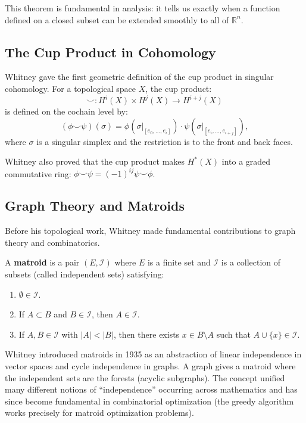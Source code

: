This theorem is fundamental in analysis: it tells us exactly when a function defined on a closed subset can be extended smoothly to all of $\mathbb{R}^n$.

\subsection{The Cup Product in Cohomology}

Whitney gave the first geometric definition of the cup product in singular cohomology. For a topological space $X$, the cup product:
\[
\smile: H^i(X) \times H^j(X) \to H^{i+j}(X)
\]
is defined on the cochain level by:
\[
(\phi \smile \psi)(\sigma) = \phi(\sigma|_{[e_0,\dots,e_i]}) \cdot \psi(\sigma|_{[e_i,\dots,e_{i+j}]}),
\]
where $\sigma$ is a singular simplex and the restriction is to the front and back faces.

Whitney also proved that the cup product makes $H^*(X)$ into a graded commutative ring: $\phi \smile \psi = (-1)^{ij} \psi \smile \phi$.

\subsection{Graph Theory and Matroids}

Before his topological work, Whitney made fundamental contributions to graph theory and combinatorics.

A \textbf{matroid} is a pair $(E, \mathcal{I})$ where $E$ is a finite set and $\mathcal{I}$ is a collection of subsets (called independent sets) satisfying:
\begin{enumerate}
    \item $\emptyset \in \mathcal{I}$.
    \item If $A \subset B$ and $B \in \mathcal{I}$, then $A \in \mathcal{I}$.
    \item If $A, B \in \mathcal{I}$ with $|A| < |B|$, then there exists $x \in B \setminus A$ such that $A \cup \{x\} \in \mathcal{I}$.
\end{enumerate}

Whitney introduced matroids in 1935 as an abstraction of linear independence in vector spaces and cycle independence in graphs. A graph gives a matroid where the independent sets are the forests (acyclic subgraphs). The concept unified many different notions of ``independence'' occurring across mathematics and has since become fundamental in combinatorial optimization (the greedy algorithm works precisely for matroid optimization problems).

